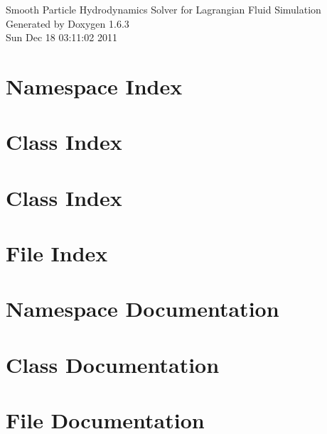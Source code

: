 \documentclass[a4paper]{book}
\begin{document}
\hypersetup{pageanchor=false}
\begin{titlepage}
\vspace*{7cm}
\begin{center}
{\Large Smooth Particle Hydrodynamics Solver for Lagrangian Fluid Simulation }\\
\vspace*{1cm}
{\large Generated by Doxygen 1.6.3}\\
\vspace*{0.5cm}
{\small Sun Dec 18 03:11:02 2011}\\
\end{center}
\end{titlepage}
\clearemptydoublepage
{}
\tableofcontents
\clearemptydoublepage
{}
\hypersetup{pageanchor=true}
\chapter{Namespace Index}

\chapter{Class Index}

\chapter{Class Index}

\chapter{File Index}

\chapter{Namespace Documentation}

\chapter{Class Documentation}











\chapter{File Documentation}























\printindex
\end{document}
